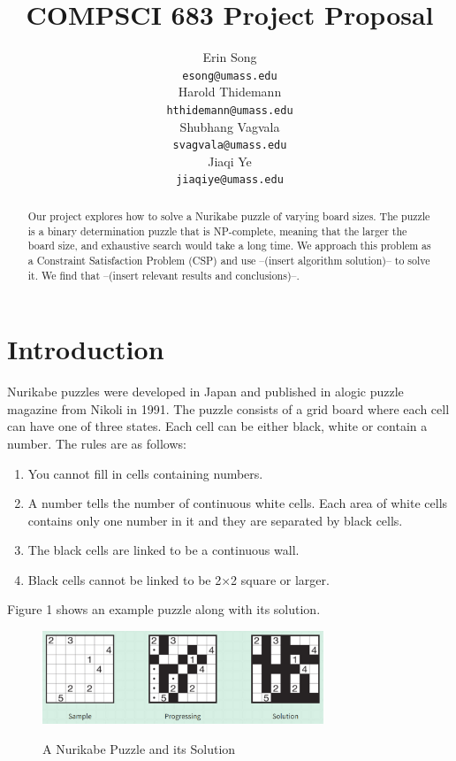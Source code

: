 \documentclass{article}
\title{COMPSCI 683 Project Proposal}
\author{%
  Erin Song\\
  \texttt{esong@umass.edu} \\
  \And
  Harold Thidemann\\
  \texttt{hthidemann@umass.edu} \\
  \And
  Shubhang Vagvala\\
  \texttt{svagvala@umass.edu} \\
  \And
  Jiaqi Ye\\
  \texttt{jiaqiye@umass.edu} \\
}
\theoremstyle{definition}
\begin{document}
\maketitle


\begin{abstract}
Our project explores how to solve a Nurikabe puzzle of varying board sizes. The puzzle is a binary determination puzzle that is NP-complete, 
meaning that the larger the board size, and exhaustive search would take a long time. We approach this problem as a Constraint Satisfaction 
Problem (CSP) and use --(insert algorithm solution)-- to solve it. We find that --(insert relevant results and conclusions)--. 
\end{abstract}

\section{Introduction}\label{sec:intro}
Nurikabe puzzles were developed in Japan and published in alogic puzzle magazine from Nikoli in 1991. The puzzle consists of a grid board 
where each cell can have one of three states. Each cell can be either black, white or contain a number. The rules are as follows:
\begin{enumerate}
    \item You cannot fill in cells containing numbers.
    \item A number tells the number of continuous white cells. Each area of white cells contains only one number in it and they are separated by black cells.
    \item The black cells are linked to be a continuous wall.
    \item Black cells cannot be linked to be 2×2 square or larger.
\end{enumerate}

Figure 1 shows an example puzzle along with its solution.  \\

\begin{figure}[h]
    \centering
    \includegraphics[width=0.75\textwidth]{./images/example.png} \\
    \caption{A Nurikabe Puzzle and its Solution}
\end{figure}
\end{document}
